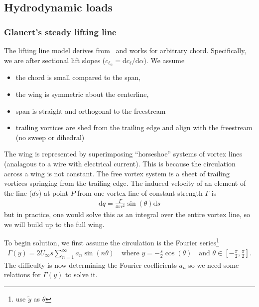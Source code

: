 \documentclass[10pt]{article}
\newcommand{\be}{\begin{eqnarray}}
\newcommand{\ee}{\end{eqnarray}}
\newcommand{\Uinf}{U_{\infty}}
\newcommand{\tn}[1]{\textrm{#1}}
\begin{document}
\subsection{Hydrodynamic loads}
% 
\subsubsection{Glauert's steady lifting line}
% 
The lifting line model derives from~\citet[Ch. XI]{Glauert1983a} and works for arbitrary chord.
Specifically, we are after sectional lift slopes ($\textstyle c_{\ell_\alpha} = \tn{d}c_\ell/\tn{d}\alpha$).
We assume
\begin{itemize}
    \item the chord is small compared to the span,
    \item the wing is symmetric about the centerline,
    \item span is straight and orthogonal to the freestream
    \item trailing vortices are shed from the trailing edge and align with the freestream (no sweep or dihedral)
\end{itemize}

The wing is represented by superimposing ``horseshoe'' systems of vortex lines (analagous to a wire with electrical current).
This is because the circulation across a wing is not constant.
The free vortex system is a sheet of trailing vortices springing from the trailing edge.
The induced velocity of an element of the line ($ds$) at point $P$ from one vortex line of constant strength $\Gamma$ is
\be
\tn{d}q = \frac{\Gamma}{4 \pi r^2} \sin(\theta) \tn{d}s
\ee
but in practice, one would solve this as an integral over the entire vortex line, so we will build up to the full wing.

To begin solution, we first assume the circulation is the Fourier series\footnote{\citet{Kerwin2010} use $\tilde{y}$ as $\theta$}
\be
\Gamma(y) = 2 \Uinf s \sum_{n=1}^{\infty} a_n \sin \left( n \theta \right)
\quad \tn{where }
y = -\frac{s}{2}\cos(\theta)
\quad \tn{and }
\theta \in \left[-\frac{\pi}{2},\frac{\pi}{2}\right]
.
\ee
The difficulty is now determining the Fourier coefficients $a_n$ so we need some relations for $\Gamma(y)$ to solve it.
\end{document}
